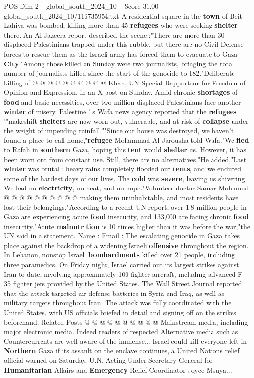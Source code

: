 \begin{textsample}{POS Dim 2 – global\_south\_2024\_10 – Score 31.00 – global\_south\_2024\_10/116735954.txt}
A residential square in the \textbf{town} of Beit Lahiya was bombed, killing more than 45 \textbf{refugees} who were seeking \textbf{shelter} there.
An Al Jazeera report described the scene :"There are more than 30 displaced Palestinians trapped under this rubble, but there are no Civil Defense forces to rescue them as the Israeli army has forced them to evacuate to Gaza \textbf{City}."Among those killed on Sunday were two journalists, bringing the total number of journalists killed since the start of the genocide to 182."Deliberate killing of @ @ @ @ @ @ @ @ @ @ Khan, UN Special Rapporteur for Freedom of Opinion and Expression, in an X post on Sunday.
Amid chronic \textbf{shortages} of \textbf{food} and basic necessities, over two million displaced Palestinians face another \textbf{winter} of misery.
Palestine ' s Wafa news agency reported that the \textbf{refugees} '"makeshift \textbf{shelters} are now worn out, vulnerable, and at risk of \textbf{collapse} under the weight of impending rainfall.""Since our house was destroyed, we haven't found a place to call home,"\textbf{refugee} Mohammad Al-Jarousha told Wafa."We \textbf{fled} to Rafah in \textbf{southern} Gaza, hoping this \textbf{tent} would \textbf{shelter} us.
However, it has been worn out from constant use.
Still, there are no alternatives."He added,"Last \textbf{winter} was brutal ; heavy rains completely flooded our \textbf{tents}, and we endured some of the hardest days of our lives.
The \textbf{cold} was \textbf{severe}, leaving us shivering.
We had no \textbf{electricity}, no heat, and no hope."Volunteer doctor Samar Mahmoud @ @ @ @ @ @ @ @ @ @ making them uninhabitable, and most residents have lost their belongings."According to a recent UN report, over 1.8 million people in Gaza are experiencing acute \textbf{food} insecurity, and 133,000 are facing chronic \textbf{food} insecurity."Acute \textbf{malnutrition} is 10 times higher than it was before the war,"the UN said in a statement.
Name : Email : The escalating genocide in Gaza takes place against the backdrop of a widening Israeli \textbf{offensive} throughout the region.
In Lebanon, nonstop Israeli \textbf{bombardments} killed over 21 people, including three paramedics.
On Friday night, Israel carried out its largest strikes against Iran to date, involving approximately 100 fighter aircraft, including advanced F-35 fighter jets provided by the United States.
The Wall Street Journal reported that the attack targeted air defense batteries in Syria and Iraq, as well as military targets throughout Iran.
The attack was fully coordinated with the United States, with US officials briefed in detail and signing off on the strikes beforehand.
Related Posts @ @ @ @ @ @ @ @ @ @ Mainstream media, including major electronic media.
Indeed readers of respected Alternative media such as Countercurrents are well aware of the immense...
Israel could kill everyone left in \textbf{Northern} Gaza if its assault on the enclave continues, a United Nations relief official warned on Saturday.
U.N.
Acting Under-Secretary-General for \textbf{Humanitarian} Affairs and \textbf{Emergency} Relief Coordinator Joyce Msuya...


\end{textsample}
